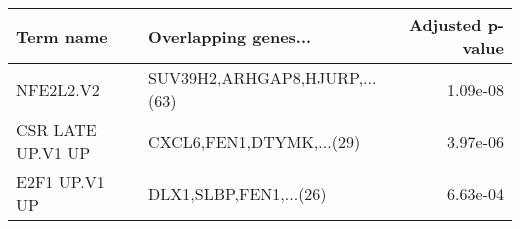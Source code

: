 \begin{tabular}{llr}
\toprule
        Term name &          Overlapping genes... &  Adjusted p-value \\
\midrule
        NFE2L2.V2 & SUV39H2,ARHGAP8,HJURP,...(63) &          1.09e-08 \\
CSR LATE UP.V1 UP &      CXCL6,FEN1,DTYMK,...(29) &          3.97e-06 \\
    E2F1 UP.V1 UP &        DLX1,SLBP,FEN1,...(26) &          6.63e-04 \\
\bottomrule
\end{tabular}
